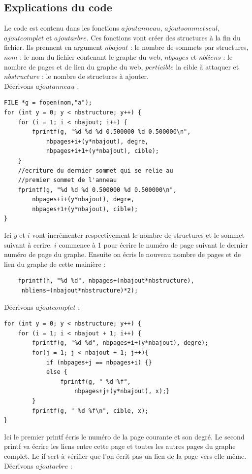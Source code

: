 \documentclass[a4paper,11pt]{article}
\begin{document}
	\subsection{Explications du code}
	Le code est contenu dans les fonctions $ajoutanneau$, $ajoutsommetseul$, $ajoutcomplet$ et $ajoutarbre$. Ces fonctions vont créer des structures à la fin du fichier. Ils
	prennent en argument $nbajout$ : le nombre de sommets par structures, $nom$ : le nom du fichier contenant le graphe du web, $nbpages$ et $nbliens$ : le nombre de pages et de lien du graphe du web, $perticible$ la cible à attaquer et $nbstructure$ : le nombre de structures à ajouter.\\
	Décrivons $ajoutanneau$ : 
	\begin{lstlisting}
FILE *g = fopen(nom,"a");
for (int y = 0; y < nbstructure; y++) {
	for (i = 1; i < nbajout; i++) {
		fprintf(g, "%d %d %d 0.500000 %d 0.500000\n", 
			nbpages+i+(y*nbajout), degre, 
			nbpages+i+1+(y*nbajout), cible);
	}
	//ecriture du dernier sommet qui se relie au 
	//premier sommet de l'anneau
	fprintf(g, "%d %d %d 0.500000 %d 0.500000\n", 
		nbpages+i+(y*nbajout), degre, 
		nbpages+1+(y*nbajout), cible);
}
	\end{lstlisting}
	Ici $y$ et $i$ vont incrémenter respectivement le nombre de structures et le sommet suivant à ecrire. $i$ commence à 1 pour écrire le numéro de page suivant le dernier numéro de page du graphe. 
	Ensuite on écris le nouveau nombre de pages et de lien du graphe de cette mainière :
	\begin{lstlisting}
	fprintf(h, "%d %d", nbpages+(nbajout*nbstructure),
	 nbliens+(nbajout*nbstructure)*2);
	\end{lstlisting}
	Décrivons $ajoutcomplet$ :
	\begin{lstlisting}
for (int y = 0; y < nbstructure; y++) {
	for (i = 1; i < nbajout + 1; i++) {
		fprintf(g, "%d %d", nbpages+i+(y*nbajout), degre);
		for(j = 1; j < nbajout + 1; j++){
			if (nbpages+j == nbpages+i) {}
			else {
				fprintf(g, " %d %f", 
					nbpages+j+(y*nbajout), x);}
		}
		fprintf(g, " %d %f\n", cible, x);
}	
	\end{lstlisting}
	Ici le premier printf écris le numéro de la page courante et son degré. Le second printf va écrire les liens entre cette page et toutes les autres pages du graphe complet. Le if sert à vérifier que l'on écrit pas un lien de la page vers elle-même.\\
	Décrivons $ajoutarbre$ :
\end{document}

